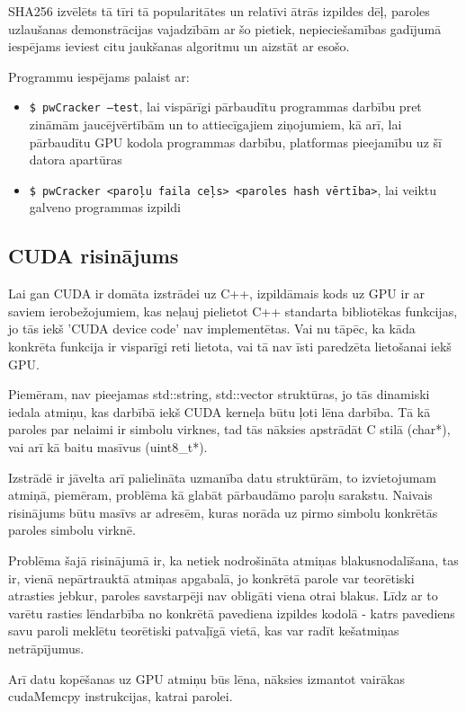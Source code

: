\documentclass[12pt]{report}%
\theoremstyle{definition}
\begin{document}
SHA256 izvēlēts tā tīri tā popularitātes un relatīvi ātrās izpildes dēļ, paroles uzlaušanas demonstrācijas
vajadzībām ar šo pietiek, nepieciešamības gadījumā iespējams ieviest citu jaukšanas algoritmu un aizstāt
ar esošo.


Programmu iespējams palaist ar:
\begin{itemize}
  \item \texttt{\$ pwCracker --test}, lai vispārīgi pārbaudītu programmas darbību pret zināmām jaucējvērtībām
  un to attiecīgajiem ziņojumiem, kā arī, lai pārbaudītu GPU kodola programmas darbību, platformas
  pieejamību uz šī datora apartūras
  \item \texttt{\$ pwCracker <paroļu faila ceļs> <paroles hash vērtība>}, lai veiktu galveno programmas izpildi
\end{itemize}


\subsection{CUDA risinājums}

Lai gan CUDA ir domāta izstrādei uz C++, izpildāmais kods uz GPU ir ar saviem ierobežojumiem, kas neļauj pielietot C++ standarta bibliotēkas funkcijas, jo tās iekš 'CUDA device code' nav implementētas.
Vai nu tāpēc, ka kāda konkrēta funkcija ir visparīgi reti lietota, vai tā nav īsti paredzēta lietošanai iekš GPU.

Piemēram, nav pieejamas std::string, std::vector struktūras, jo tās dinamiski iedala atmiņu, kas darbībā iekš CUDA kerneļa būtu ļoti lēna darbība.
Tā kā paroles par nelaimi ir simbolu virknes, tad tās nāksies apstrādāt C stilā (char*), vai arī kā baitu masīvus (uint8\_t*).

Izstrādē ir jāvelta arī palielināta uzmanība datu struktūrām, to izvietojumam atmiņā, piemēram,
problēma kā glabāt pārbaudāmo paroļu sarakstu. Naivais risinājums būtu masīvs ar adresēm, kuras norāda uz pirmo simbolu konkrētās paroles simbolu virknē.

Problēma šajā risinājumā ir, ka netiek nodrošināta atmiņas blakusnodalīšana, tas ir, vienā nepārtrauktā atmiņas
apgabalā, jo konkrētā parole var teorētiski atrasties jebkur, paroles savstarpēji nav obligāti viena otrai
blakus. Līdz ar to varētu rasties lēndarbība no konkrētā pavediena izpildes kodolā - katrs pavediens savu
paroli meklētu teorētiski patvaļīgā vietā, kas var radīt kešatmiņas netrāpījumus.


Arī datu kopēšanas uz GPU atmiņu būs lēna, nāksies izmantot vairākas cudaMemcpy instrukcijas, katrai parolei.
\end{document}
